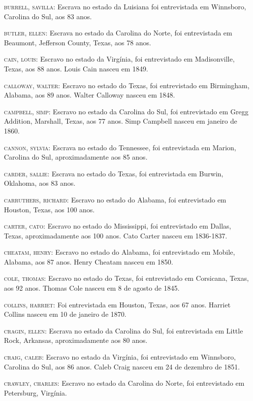 \begin{Parskip}
\textsc{burrell, savilla:} Escrava no estado da Luisiana foi
entrevistada em Winnsboro, Carolina do Sul, aos 83 anos.

\textsc{butler, ellen:} Escrava no estado da Carolina do Norte, foi
entrevistada em Beaumont, Jefferson County, Texas, aos 78 anos.

\textsc{cain, louis:} Escravo no estado da Virgínia, foi entrevistado em
Madisonville, Texas, aos 88 anos. Louis Cain nasceu em 1849.

\textsc{calloway, walter:} Escravo no estado do Texas, foi entrevistado
em Birmingham, Alabama, aos 89 anos. Walter Calloway nasceu em 1848.

\textsc{campbell, simp:} Escravo no estado da Carolina do Sul, foi
entrevistado em Gregg Addition, Marshall, Texas, aos 77 anos. Simp
Campbell nasceu em janeiro de 1860.

\textsc{cannon, sylvia:} Escrava no estado do Tennessee, foi
entrevistada em Marion, Carolina do Sul, aproximadamente aos 85 anos.

\textsc{carder, sallie:} Escrava no estado do Texas, foi entrevistada em
Burwin, Oklahoma, aos 83 anos.

\textsc{carruthers, richard:} Escravo no estado do Alabama, foi
entrevistado em Houston, Texas, aos 100 anos.

\textsc{carter, cato:} Escravo no estado do Mississippi, foi
entrevistado em Dallas, Texas, aproximadamente aos 100 anos. Cato Carter
nasceu em 1836-1837.

\textsc{cheatam, henry:} Escravo no estado do Alabama, foi entrevistado
em Mobile, Alabama, aos 87 anos. Henry Cheatam nasceu em 1850.

\textsc{cole, thomas:} Escravo no estado do Texas, foi entrevistado em
Corsicana, Texas, aos 92 anos. Thomas Cole nasceu em 8 de agosto de
1845.

\textsc{collins, harriet:} Foi entrevistada em Houston, Texas, aos 67
anos. Harriet Collins nasceu em 10 de janeiro de 1870.

\textsc{cragin, ellen:} Escrava no estado da Carolina do Sul, foi
entrevistada em Little Rock, Arkansas, aproximadamente aos 80 anos.

\textsc{craig, caleb:} Escravo no estado da Virgínia, foi entrevistado
em Winnsboro, Carolina do Sul, aos 86 anos. Caleb Craig nasceu em 24 de
dezembro de 1851.

\textsc{crawley, charles:} Escravo no estado da Carolina do Norte, foi
entrevistado em Petersburg, Virgínia.


\end{Parskip}
